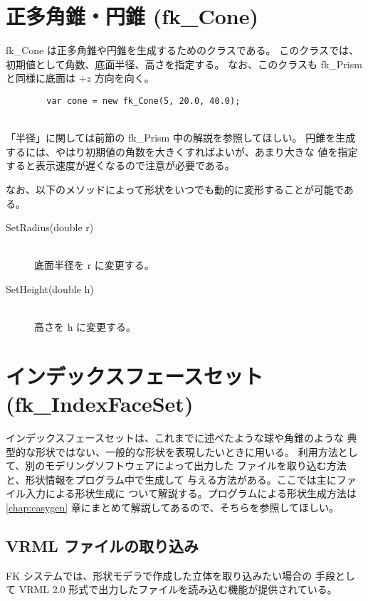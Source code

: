 \section{正多角錐・円錐 (fk\_Cone)}
fk\_Cone は正多角錐や円錐を生成するためのクラスである。
このクラスでは、初期値として角数、底面半径、高さを指定する。
なお、このクラスも fk\_Prism と同様に底面は \(+z\) 方向を向く。
\\
\begin{screen}
\begin{verbatim}
        var cone = new fk_Cone(5, 20.0, 40.0);
\end{verbatim}
\end{screen}
~ \\
「半径」に関しては前節の fk\_Prism 中の解説を参照してほしい。
円錐を生成するには、やはり初期値の角数を大きくすればよいが、あまり大きな
値を指定すると表示速度が遅くなるので注意が必要である。

なお、以下のメソッドによって形状をいつでも動的に変形することが可能である。

\begin{description}
\item[SetRadius(double r)] ~ \\
	底面半径を r に変更する。\\

\item[SetHeight(double h)] ~ \\
	高さを h に変更する。
\end{description}

\section{インデックスフェースセット (fk\_IndexFaceSet)}
インデックスフェースセットは、これまでに述べたような球や角錐のような
典型的な形状ではない、一般的な形状を表現したいときに用いる。
利用方法として、別のモデリングソフトウェアによって出力した
ファイルを取り込む方法と、形状情報をプログラム中で生成して
与える方法がある。ここでは主にファイル入力による形状生成に
ついて解説する。プログラムによる形状生成方法は
\ref{chap:easygen} 章にまとめて解説してあるので、そちらを参照してほしい。

\subsection{VRML ファイルの取り込み}
FK システムでは、形状モデラで作成した立体を取り込みたい場合の
手段として VRML 2.0 形式で出力したファイルを読み込む機能が提供されている。

